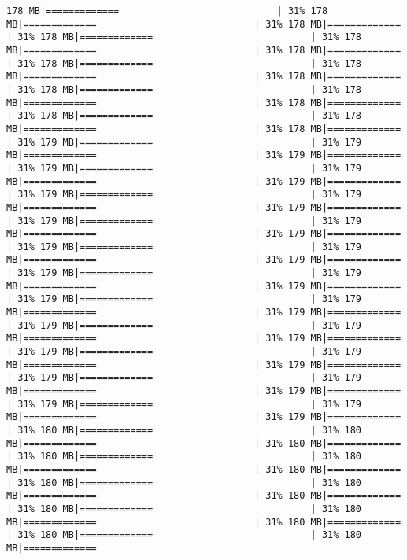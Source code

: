 \documentclass[
]{article}
\begin{document}
\begin{verbatim}
178 MB|=============                            | 31% 178 MB|=============                            | 31% 178 MB|=============                            | 31% 178 MB|=============                            | 31% 178 MB|=============                            | 31% 178 MB|=============                            | 31% 178 MB|=============                            | 31% 178 MB|=============                            | 31% 178 MB|=============                            | 31% 178 MB|=============                            | 31% 178 MB|=============                            | 31% 178 MB|=============                            | 31% 178 MB|=============                            | 31% 178 MB|=============                            | 31% 178 MB|=============                            | 31% 179 MB|=============                            | 31% 179 MB|=============                            | 31% 179 MB|=============                            | 31% 179 MB|=============                            | 31% 179 MB|=============                            | 31% 179 MB|=============                            | 31% 179 MB|=============                            | 31% 179 MB|=============                            | 31% 179 MB|=============                            | 31% 179 MB|=============                            | 31% 179 MB|=============                            | 31% 179 MB|=============                            | 31% 179 MB|=============                            | 31% 179 MB|=============                            | 31% 179 MB|=============                            | 31% 179 MB|=============                            | 31% 179 MB|=============                            | 31% 179 MB|=============                            | 31% 179 MB|=============                            | 31% 179 MB|=============                            | 31% 179 MB|=============                            | 31% 179 MB|=============                            | 31% 179 MB|=============                            | 31% 179 MB|=============                            | 31% 179 MB|=============                            | 31% 179 MB|=============                            | 31% 179 MB|=============                            | 31% 179 MB|=============                            | 31% 179 MB|=============                            | 31% 179 MB|=============                            | 31% 179 MB|=============                            | 31% 179 MB|=============                            | 31% 179 MB|=============                            | 31% 180 MB|=============                            | 31% 180 MB|=============                            | 31% 180 MB|=============                            | 31% 180 MB|=============                            | 31% 180 MB|=============                            | 31% 180 MB|=============                            | 31% 180 MB|=============                            | 31% 180 MB|=============                            | 31% 180 MB|=============                            | 31% 180 MB|=============                            | 31% 180 MB|=============                            | 31% 180 MB|=============                            | 31% 180 MB|=============                            | 31% 180 MB|=============     
\end{verbatim}
\end{document}
